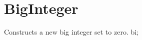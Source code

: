 \hypertarget{BigInteger-example}{}\section{Big\+Integer}
Constructs a new big integer set to zero. bi;


\begin{DoxyCodeInclude}
\end{DoxyCodeInclude}
 